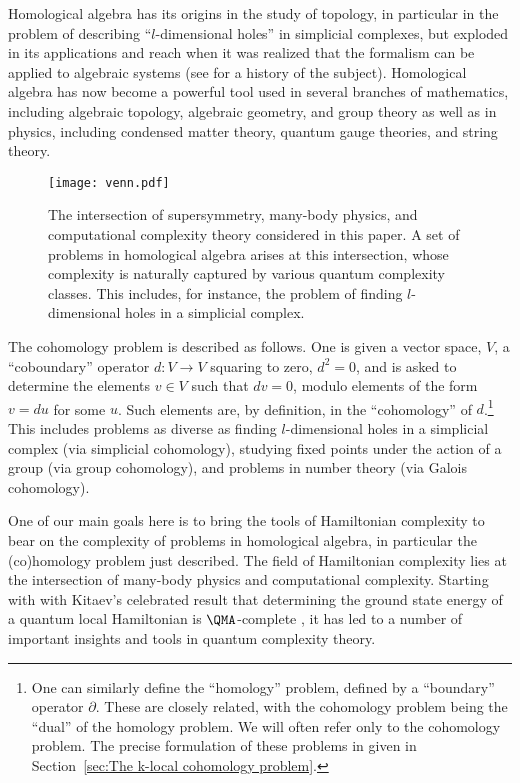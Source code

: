 \documentclass[11pt]{article}
\numberwithin{equation}{section}
\renewcommand\( {\left(}
\renewcommand\) {\right)}
\begin{document}
Homological algebra has its origins in the study of topology, in particular in the problem of describing ``$l$-dimensional holes'' in simplicial complexes, but exploded in its applications and reach when it was realized that the formalism can be applied to algebraic systems (see \cite{WEIBEL1999797} for a history of the subject). Homological algebra has now become a powerful tool used in several branches of mathematics, including algebraic topology, algebraic geometry, and group theory as well as in physics, including  condensed matter theory, quantum gauge theories, and string theory. 


\begin{figure}
\begin{center}
\texttt{[image: venn.pdf]}
\end{center}
\caption{The intersection of supersymmetry, many-body physics, and  computational complexity theory considered in this paper. A set of problems in  homological algebra arises at this intersection, whose complexity is naturally captured by various quantum complexity classes. This includes, for instance, the problem of finding $l$-dimensional holes in a simplicial complex.  }
\label{QCT}
\end{figure}


The cohomology problem is described as follows. One is given a vector space, $V$, a ``coboundary'' operator $d:V\to V$ squaring to zero, $d^2=0$, and  is asked to determine the elements $v\in V$ such that $dv=0$, modulo elements of the form $v=du$ for some $u$.
Such elements are, by definition, in the ``cohomology'' of $d$.\footnote{One can similarly define the ``homology'' problem, defined by a ``boundary'' operator $\partial$. These are closely related, with the cohomology problem being the ``dual'' of the homology problem. We will often refer only to the cohomology problem. The precise formulation of these problems in given in Section~\ref{sec:The k-local cohomology problem}. } This includes problems as diverse as finding $l$-dimensional holes in a simplicial complex (via simplicial cohomology), studying fixed points under the action of a group (via group cohomology), and  problems in number theory (via Galois cohomology).



One of our main goals here is to bring the tools of Hamiltonian complexity to  bear on the  complexity of problems in homological algebra, in particular the (co)homology problem just described. The field of  Hamiltonian complexity lies at the intersection of many-body physics and computational complexity. Starting with with Kitaev's celebrated result that determining  the ground state energy of a quantum local Hamiltonian is $\QMA$-complete  \cite{KitaevBook,2003quant.ph..2079K,2004quant.ph..6180K},  it has led to a number of important insights and tools in quantum complexity theory. 
\end{document}
